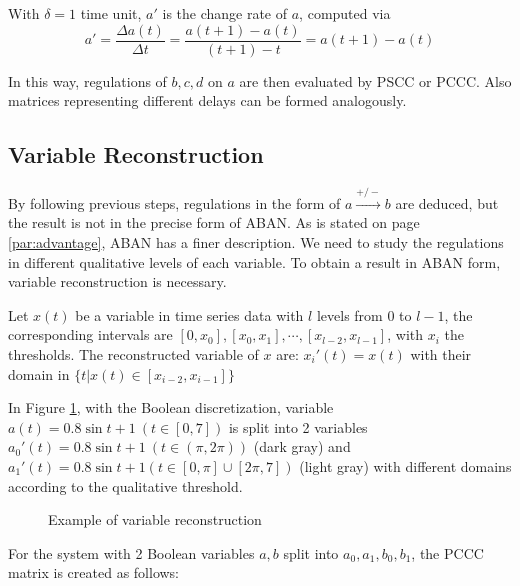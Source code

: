 With $ \delta = 1$ time unit, $a'$ is the change rate of $a$, computed via 
\begin{equation}\label{eq:changeRate}
    a'=\dfrac{\Delta a(t)}{\Delta t}=\dfrac{a(t+1)-a(t)}{(t+1)-t}=a(t+1)-a(t)
\end{equation}

In this way, regulations of $b,c,d$ on $a$ are then evaluated by PSCC or PCCC.
Also matrices representing different delays can be formed analogously.

\subsection{Variable Reconstruction}
By following previous steps, regulations in the form of $a\xrightarrow{+/-}b$ are deduced, but the result is not in the precise form of ABAN. 
As is stated on page \ref{par:advantage}, ABAN has a finer description.
We need to study the regulations in different qualitative levels of each variable.
To obtain a result in ABAN form, variable reconstruction is necessary.

\begin{definition}
    Let $x(t)$ be a variable in time series data with $l$ levels from $0$ to $l-1$, the corresponding intervals are $[0,x_0],[x_0,x_1],\cdots,[x_{l-2},x_{l-1}]$, with $x_i$ the thresholds. 
    The reconstructed variable of $x$ are:
        $x_i'(t)=x(t)$ with their domain in $\{t|x(t)\in [x_{i-2},x_{i-1}]\}$
\end{definition}

\begin{example}
In Figure \ref{varRec}, with the Boolean discretization, variable $a(t)=0.8\sin t+1\ (t\in [0,7])$ is split into 2 variables $a_0'(t)=0.8\sin t+1\ (t\in (\pi,2\pi))$ (dark gray) and $a_1'(t)=0.8\sin t+1(t\in [0,\pi]\cup[2\pi,7])$ (light gray) with different domains according to the qualitative threshold.
\end{example}

\begin{figure}[ht]

\caption[Variable reconstruction]{Example of variable reconstruction}\label{varRec}
\end{figure}


For the system with 2 Boolean variables $a,b$ split into $a_0,a_1,b_0,b_1$, the PCCC matrix is created as follows:



